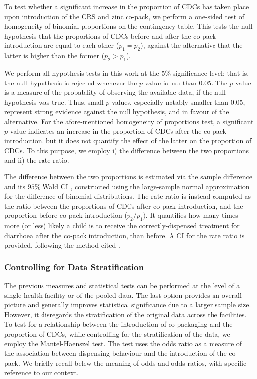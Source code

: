\documentclass[a4paper, 12pt]{article}
\begin{document}
To test whether a significant increase in the proportion of CDCs has taken place upon introduction of the ORS and zinc co-pack, we perform a one-sided test of homogeneity of binomial proportions on the contingency table. This tests the null hypothesis that the proportions of CDCs before and after the co-pack introduction are equal to each other ($p_1=p_2$), against the alternative that the latter is higher than the former ($p_2>p_1$).

We perform all hypothesis tests in this work at the 5\% significance level: that is, the null hypothesis is rejected whenever the $p$-value is less than 0.05. The $p$-value is a measure of the probability of observing the available data, if the null hypothesis was true. Thus,
small $p$-values, especially notably smaller than 0.05, represent strong evidence against the null hypothesis, and in favour of the alternative.
For the afore-mentioned homogeneity of proportions test, a significant $p$-value indicates an increase in the proportion of CDCs after the co-pack introduction, but it does not quantify the effect of the latter on the proportion of CDCs. To this purpose, we employ i) the difference between the two proportions and ii) the rate ratio. 

The difference between the two proportions is estimated via the sample difference and its $95\%$ Wald CI \cite{agresti2002}, constructed using the large-sample normal approximation for the difference of binomial distributions. 
The rate ratio is instead computed as the ratio between the proportions of CDCs after co-pack introduction, and the proportion before co-pack introduction ($p_2/p_1)$. It quantifies how many times more (or less) likely a child is to receive the correctly-dispensed treatment for diarrhoea after the co-pack introduction, than before. A CI for the rate ratio is provided, following the method cited \cite{agresti2002, nam1995}.

\subsubsection{Controlling for Data Stratification}

The previous measures and statistical tests can be performed at the level of a single health facility or of the pooled data. The last option provides an overall picture and generally improves statistical significance due to a larger sample size. However, it disregards the stratification of the original data across the facilities. To test for a relationship between the introduction of co-packaging and the proportion of CDCs, while controlling for the stratification of the data, we employ the Mantel-Haenszel test.
The test uses the odds ratio as a measure of the association between dispensing behaviour and the introduction of the co-pack. We briefly recall below the meaning of odds and odds ratios, with specific reference to our context.
\end{document}

